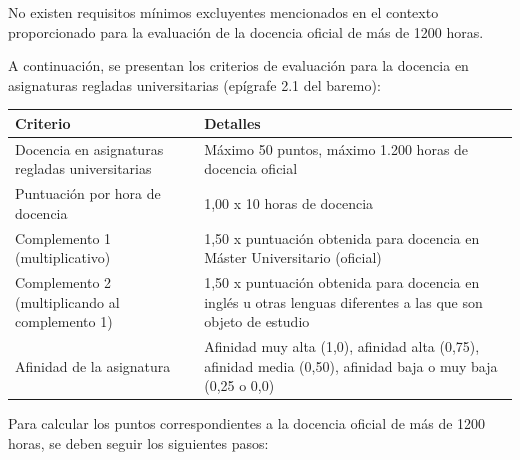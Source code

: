 \documentclass{article}
\begin{document}
\begin{itemize}
\begin{itemize}
                        No existen requisitos mínimos excluyentes mencionados en el contexto proporcionado para la evaluación de la docencia oficial de más de 1200 horas.

                        A continuación, se presentan los criterios de evaluación para la docencia en asignaturas regladas universitarias (epígrafe 2.1 del baremo):

                        \vspace{0.4cm}
                        \begin{table}[h!]\centering\renewcommand{\arraystretch}{1.3}
                              \begin{tabular}{|p{}|p{}|}\hline
                                    Criterio                                        & Detalles                                                                                                      \\\hline
                                    Docencia en asignaturas regladas universitarias & Máximo 50 puntos, máximo 1.200 horas de docencia oficial                                                      \\\hline
                                    Puntuación por hora de docencia                 & 1,00 x 10 horas de docencia                                                                                   \\\hline
                                    Complemento 1 (multiplicativo)                  & 1,50 x puntuación obtenida para docencia en Máster Universitario (oficial)                                    \\\hline
                                    Complemento 2 (multiplicando al complemento 1)  & 1,50 x puntuación obtenida para docencia en inglés u otras lenguas diferentes a las que son objeto de estudio \\\hline
                                    Afinidad de la asignatura                       & Afinidad muy alta (1,0), afinidad alta (0,75), afinidad media (0,50), afinidad baja o muy baja (0,25 o 0,0)   \\\hline
                              \end{tabular}\end{table}
                        \vspace{0.4cm}

                        Para calcular los puntos correspondientes a la docencia oficial de más de 1200 horas, se deben seguir los siguientes pasos:


\end{itemize}
\end{itemize}
\end{document}
